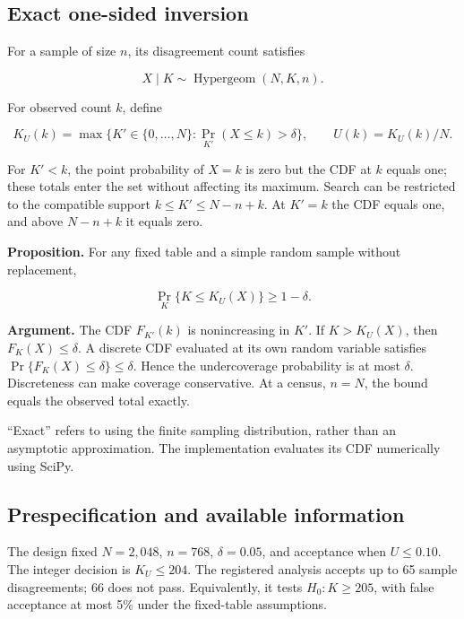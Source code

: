 \documentclass[
  10pt,
]{article}
\begin{document}
\hypertarget{exact-one-sided-inversion}{%
\subsection{Exact one-sided inversion}\label{exact-one-sided-inversion}}

For a sample of size \(n\), its disagreement count satisfies

\[X\mid K\sim\operatorname{Hypergeom}(N,K,n).\]

For observed count \(k\), define

\[
K_U(k)=\max\{K'\in\{0,\ldots,N\}:\Pr_{K'}(X\le k)>\delta\},
\qquad U(k)=K_U(k)/N.
\]

For \(K'<k\), the point probability of \(X=k\) is zero but the CDF at
\(k\) equals one; these totals enter the set without affecting its
maximum. Search can be restricted to the compatible support
\(k\le K'\le N-n+k\). At \(K'=k\) the CDF equals one, and above
\(N-n+k\) it equals zero.

\textbf{Proposition.} For any fixed table and a simple random sample
without replacement,

\[\Pr_K\{K\le K_U(X)\}\ge1-\delta.\]

\textbf{Argument.} The CDF \(F_{K'}(k)\) is nonincreasing in \(K'\). If
\(K>K_U(X)\), then \(F_K(X)\le\delta\). A discrete CDF evaluated at its
own random variable satisfies \(\Pr\{F_K(X)\le\delta\}\le\delta\). Hence
the undercoverage probability is at most \(\delta\). Discreteness can
make coverage conservative. At a census, \(n=N\), the bound equals the
observed total exactly.

``Exact'' refers to using the finite sampling distribution, rather than
an asymptotic approximation. The implementation evaluates its CDF
numerically using SciPy.

\hypertarget{prespecification-and-available-information}{%
\subsection{Prespecification and available
information}\label{prespecification-and-available-information}}

The design fixed \(N=2,048\), \(n=768\), \(\delta=0.05\), and acceptance
when \(U\le0.10\). The integer decision is \(K_U\le204\). The registered
analysis accepts up to 65 sample disagreements; 66 does not pass.
Equivalently, it tests \(H_0:K\ge205\), with false acceptance at most
5\% under the fixed-table assumptions.
\end{document}
